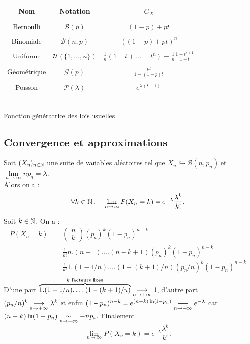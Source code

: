 \documentclass{book}
\begin{document}
\begin{center}

\begin{tabular}{ccc}
Nom&Notation & $G_X$\\\hline 
&& \\
Bernoulli & $\mathcal{B}(p)$& $(1-p)+pt$\\\hline
&& \\
Binomiale & $\mathcal{B}(n,p)$& $\left((1-p)+pt\right)^n$\\\hline
&& \\
Uniforme &$\mathcal{U}( \{1,\dots , n\})$& $\frac{1}{n}(1+t+\dots+t^{n})=\frac{1}{n}\frac{1-t^{n+1}}{1-t}$\\\hline
&& \\
Géométrique &$\mathcal{G}( p)$& $\frac{pt}{1-(1-p)t}$\\\hline
&& \\
Poisson &$\mathcal{P}(\lambda)$& $e^{\lambda(t-1)}$\\\hline

\end{tabular}\\
Fonction génératrice des lois usuelles
\end{center}


\subsection{Convergence et approximations}

\begin{Proposition}
Soit $(X_n)_{n\in\mathbb{N}}$ une suite de variables aléatoires tel que $X_n\hookrightarrow \mathcal{B}(n,p_n)$ et $\lim\limits_{n\to\infty}np_n=\lambda$.\\
Alors on a :
$$\forall k \in \mathbb{N}:\quad  \lim\limits_{n\to\infty} P(X_n = k) = e^{-\lambda}\frac{\lambda^k}{k!}.$$
\end{Proposition}
\begin{Demonstration}
Soit $k\in \mathbb{N}$. On a :
$$\begin{aligned}
P(X_n = k) &= \begin{pmatrix}n \\ k \end{pmatrix} (p_n)^k (1-p_n)^{n-k}\\
&= \frac{1}{k!} n.(n-1).\dots (n-k+1)(p_n)^k (1-p_n)^{n-k} \\
&= \frac{1}{k!} 1.(1-1/n).\dots (1-(k+1)/n)(p_n/n)^k (1-p_n)^{n-k} \\
\end{aligned}$$
D'une part  $\overbrace{1.(1-1/n).\dots (1-(k+1)/n)}^{k \text{ facteurs fixes}}\tend[n\to+\infty]1$, d'autre part $(p_n/n)^k\tend[n\to+\infty] \lambda^k$ et enfin $(1-p_n)^{n-k}=e^{(n-k)\ln(1-p_n)}\tend[n\to+\infty] e^{-\lambda}$ car $(n-k)\ln(1-p_n)\equivalent[n\to+\infty] -np_n$. Finalement
$$\lim\limits_{n\to\infty} P(X_n = k) = e^{-\lambda}\frac{\lambda^k}{k!}.$$
\end{Demonstration}
\end{document}
